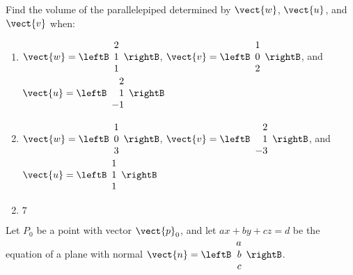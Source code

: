 \begin{multicols}{2}
\begin{ex}
Find the volume of the parallelepiped determined by $\vect{w}$, $\vect{u}$, and $\vect{v}$ when:


\begin{enumerate}[label={\alph*.}]
\item 
$\vect{w} = \leftB
\begin{array}{r}
2\\
1\\
1
\end{array}
\rightB$, 
$\vect{v} = \leftB
\begin{array}{r}
1\\
0\\
2
\end{array}
\rightB$, and 
$\vect{u} = \leftB
\begin{array}{r}
2\\
1\\
-1
\end{array}
\rightB$

\item 
$\vect{w} = \leftB
\begin{array}{r}
1\\
0\\
3
\end{array}
\rightB$, 
$\vect{v} = \leftB
\begin{array}{r}
2\\
1\\
-3
\end{array}
\rightB$, and 
$\vect{u} = \leftB
\begin{array}{r}
1\\
1\\
1
\end{array}
\rightB$

\end{enumerate}
\begin{sol}
\begin{enumerate}[label={\alph*.}]
\setcounter{enumi}{1}
\item $7$

\end{enumerate}
\end{sol}
\end{ex}

\begin{ex}
Let $P_{0}$ be a point with vector $\vect{p}_{0}$, and let $ax + by + cz = d$ be the equation of a plane with normal 
$\vect{n} = \leftB
\begin{array}{r}
a\\
b\\
c
\end{array}
\rightB$.


\end{ex}
\end{multicols}
